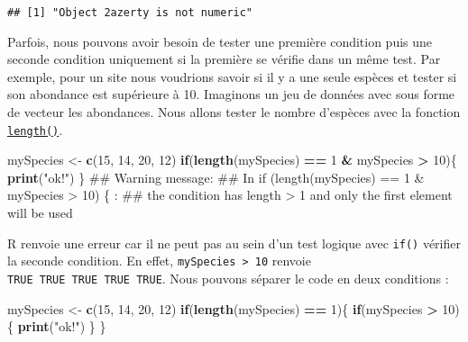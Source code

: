 \documentclass[]{book}
\newenvironment{Shaded}{\begin{snugshade}}{\end{snugshade}}
\newcommand{\KeywordTok}[1]{\textcolor[rgb]{0.13,0.29,0.53}{\textbf{#1}}}
\newcommand{\DecValTok}[1]{\textcolor[rgb]{0.00,0.00,0.81}{#1}}
\newcommand{\StringTok}[1]{\textcolor[rgb]{0.31,0.60,0.02}{#1}}
\newcommand{\ControlFlowTok}[1]{\textcolor[rgb]{0.13,0.29,0.53}{\textbf{#1}}}
\newcommand{\OperatorTok}[1]{\textcolor[rgb]{0.81,0.36,0.00}{\textbf{#1}}}
\newcommand{\NormalTok}[1]{#1}
\theoremstyle{definition}
\theoremstyle{definition}
\theoremstyle{definition}
\theoremstyle{remark}
\begin{document}
\begin{verbatim}
## [1] "Object 2azerty is not numeric"
\end{verbatim}

Parfois, nous pouvons avoir besoin de tester une première condition puis
une seconde condition uniquement si la première se vérifie dans un même
test. Par exemple, pour un site nous voudrions savoir si il y a une
seule espèces et tester si son abondance est supérieure à 10. Imaginons
un jeu de données avec sous forme de vecteur les abondances. Nous allons
tester le nombre d'espèces avec la fonction
\protect\hyperlink{l015length}{\texttt{length()}}.

\begin{Shaded}
\begin{Highlighting}[]
\NormalTok{mySpecies <-}\StringTok{ }\KeywordTok{c}\NormalTok{(}\DecValTok{15}\NormalTok{, }\DecValTok{14}\NormalTok{, }\DecValTok{20}\NormalTok{, }\DecValTok{12}\NormalTok{)}
\ControlFlowTok{if}\NormalTok{(}\KeywordTok{length}\NormalTok{(mySpecies) }\OperatorTok{==}\StringTok{ }\DecValTok{1} \OperatorTok{&}\StringTok{ }\NormalTok{mySpecies }\OperatorTok{>}\StringTok{ }\DecValTok{10}\NormalTok{)\{}
  \KeywordTok{print}\NormalTok{(}\StringTok{"ok!"}\NormalTok{)}
\NormalTok{\}}
\NormalTok{## Warning message:}
\NormalTok{## In if (length(mySpecies) == 1 & mySpecies > 10) \{ :}
\NormalTok{##   the condition has length > 1 and only the first element will be used}
\end{Highlighting}
\end{Shaded}

R renvoie une erreur car il ne peut pas au sein d'un test logique avec
\texttt{if()} vérifier la seconde condition. En effet,
\texttt{mySpecies\ \textgreater{}\ 10} renvoie
\texttt{TRUE\ TRUE\ TRUE\ TRUE\ TRUE}. Nous pouvons séparer le code en
deux conditions :

\begin{Shaded}
\begin{Highlighting}[]
\NormalTok{mySpecies <-}\StringTok{ }\KeywordTok{c}\NormalTok{(}\DecValTok{15}\NormalTok{, }\DecValTok{14}\NormalTok{, }\DecValTok{20}\NormalTok{, }\DecValTok{12}\NormalTok{)}
\ControlFlowTok{if}\NormalTok{(}\KeywordTok{length}\NormalTok{(mySpecies) }\OperatorTok{==}\StringTok{ }\DecValTok{1}\NormalTok{)\{}
  \ControlFlowTok{if}\NormalTok{(mySpecies }\OperatorTok{>}\StringTok{ }\DecValTok{10}\NormalTok{)\{}
    \KeywordTok{print}\NormalTok{(}\StringTok{"ok!"}\NormalTok{)}
\NormalTok{  \}}
\NormalTok{\}}
\end{Highlighting}
\end{Shaded}
\end{document}
